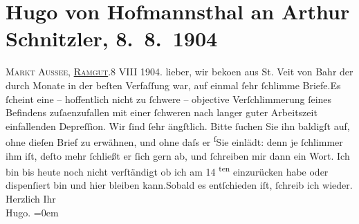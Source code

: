 

         
         \renewcommand{\erwaehntePersonen}{Personen: Hermann Bahr}
         \renewcommand{\erwaehnteOrte}{Orte: Bad Aussee, Ramgut, Sankt Veit, Wien}
         \renewcommand{\erwaehnteWerke}{}
               \section[Hugo von Hofmannsthal an Arthur Schnitzler, 8. 8. 1904]{ Hugo von Hofmannsthal an Arthur Schnitzler, 8. 8. 1904}\nopagebreak{}\rehead{ }\begin{ledgroupsized}[t]{13cm}\normalsize\beginnumbering \toendnotes[C]{\smallbreak\pagebreak[2]} 
\pstart
           {\pb}\textsc{Markt Aussee, \uline{Ramgut}.}\hfill 8 VIII 1904.\pend
           \pstart
           lieber, wir beko{\geminationm}en aus St. Veit von Bahr der durch Monate in der beſten Verfaſſung war, auf einmal ſehr ſchlimme
                  Briefe.\hspace*{1.5em}Es ſcheint eine – hoffentlich nicht zu
               ſchwere – objective Verſchlimmerung ſeines Befindens zuſa{\geminationm}enzufallen mit einer ſchweren nach langer guter Arbeitszeit {\pb}einfallenden Depreſſion. Wir ſind
               ſehr ängſtlich. Bitte ſuchen Sie ihn baldigſt auf, ohne dieſen Brief zu erwähnen, und
               ohne daſs er \substVorne{}\textsuperscript{ſ}\substDazwischen{}S\substHinten{}ie einlädt: denn je ſchlimmer ihm iſt, deſto mehr ſchließt er ſich gern ab,
               und ſchreiben mir dann ein Wort.\pend
           \pstart
           Ich bin bis heute noch nicht verſtändigt ob ich am {\pb}14\textsuperscript{ ten}
               einzurücken habe oder dispenſiert bin und hier bleiben kann.\hspace*{1.5em}Sobald es entſchieden iſt, ſchreib ich wieder.\pend
           \pstart
           Herzlich Ihr{\\[\baselineskip]}\spacefill\mbox{Hugo.}\pend
           \leftskip=0em{}
         
         \endnumbering{}\end{ledgroupsized}  \newcommand{\dateiname}{L01423}\newcommand{\titel}{Hugo von Hofmannsthal an Arthur Schnitzler, 8. 8. 1904}\newcommand{\editorInnen}{ Martin Anton Müller und Gerd-Hermann Susen}
      